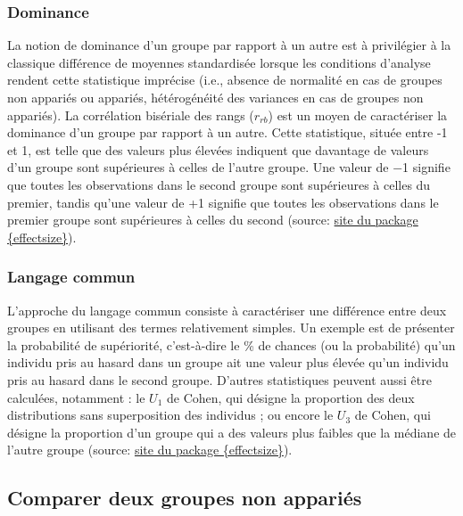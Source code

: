 \documentclass[
  letterpaper,
]{book}
\begin{document}
\subsubsection{Dominance}\label{dominance}

La notion de dominance d'un groupe par rapport à un autre est à
privilégier à la classique différence de moyennes standardisée lorsque
les conditions d'analyse rendent cette statistique imprécise (i.e.,
absence de normalité en cas de groupes non appariés ou appariés,
hétérogénéité des variances en cas de groupes non appariés). La
corrélation bisériale des rangs (\(r_{rb}\)) est un moyen de
caractériser la dominance d'un groupe par rapport à un autre. Cette
statistique, située entre -1 et 1, est telle que des valeurs plus
élevées indiquent que davantage de valeurs d'un groupe sont supérieures
à celles de l'autre groupe. Une valeur de −1 signifie que toutes les
observations dans le second groupe sont supérieures à celles du premier,
tandis qu'une valeur de +1 signifie que toutes les observations dans le
premier groupe sont supérieures à celles du second (source:
\href{https://easystats.github.io/effectsize/articles/standardized_differences.html\#dominance-effect-sizes}{site
du package \{effectsize\}}).

\subsubsection{Langage commun}\label{langage-commun}

L'approche du langage commun consiste à caractériser une différence
entre deux groupes en utilisant des termes relativement simples. Un
exemple est de présenter la probabilité de supériorité, c'est-à-dire le
\% de chances (ou la probabilité) qu'un individu pris au hasard dans un
groupe ait une valeur plus élevée qu'un individu pris au hasard dans le
second groupe. D'autres statistiques peuvent aussi être calculées,
notamment : le \(U_{1}\) de Cohen, qui désigne la proportion des deux
distributions sans superposition des individus ; ou encore le \(U_{3}\)
de Cohen, qui désigne la proportion d'un groupe qui a des valeurs plus
faibles que la médiane de l'autre groupe (source:
\href{https://easystats.github.io/effectsize/articles/standardized_differences.html\#dominance-effect-sizes}{site
du package \{effectsize\}}).

\subsection{Comparer deux groupes non
appariés}\label{comparer-deux-groupes-non-appariuxe9s}
\end{document}
